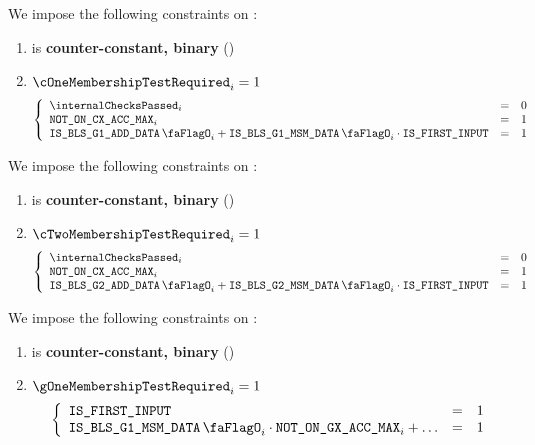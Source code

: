 We impose the following constraints on \cOneMembershipTestRequired{}:
\begin{enumerate}
    \item \cOneMembershipTestRequired{} is \textbf{counter-constant, binary} \quad (\trash)
    \item \If $\cOneMembershipTestRequired_{i} = 1$ \Then
        \[
            \left\{ \begin{array}{lcl}
                \internalChecksPassed _{i} & = & 0 \\
                \notOnCXAccMax_{i}         & = & 1 \\
                \isBlsGOneAddData_{i} + \isBlsGOneMsmData_{i} \cdot \isFirstInput & = & 1 \\
            \end{array} \right.
        \]
\end{enumerate}
\noindent
We impose the following constraints on \cTwoMembershipTestRequired{}:
\begin{enumerate}
    \item \cTwoMembershipTestRequired{} is \textbf{counter-constant, binary} \quad (\trash)
    \item \If $\cTwoMembershipTestRequired_{i} = 1$ \Then
        \[
            \left\{ \begin{array}{lcl}
                \internalChecksPassed _{i} & = & 0 \\
                \notOnCXAccMax_{i}         & = & 1 \\
                \isBlsGTwoAddData_{i} + \isBlsGTwoMsmData_{i} \cdot \isFirstInput & = & 1 \\
            \end{array} \right.
        \]
\end{enumerate}
\noindent
We impose the following constraints on \gOneMembershipTestRequired{}:
\begin{enumerate}
    \item \gOneMembershipTestRequired{} is \textbf{counter-constant, binary} \quad (\trash)
    \item \If $\gOneMembershipTestRequired_{i} = 1$ \Then
        \[
            \left\{ \begin{array}{lcl}
                \isFirstInput & = & 1 \\
                \isBlsGOneMsmData_{i} \cdot \notOnGXAccMax_{i}  + \hdots & = & 1 \\
            \end{array} \right.
        \]
\end{enumerate}
